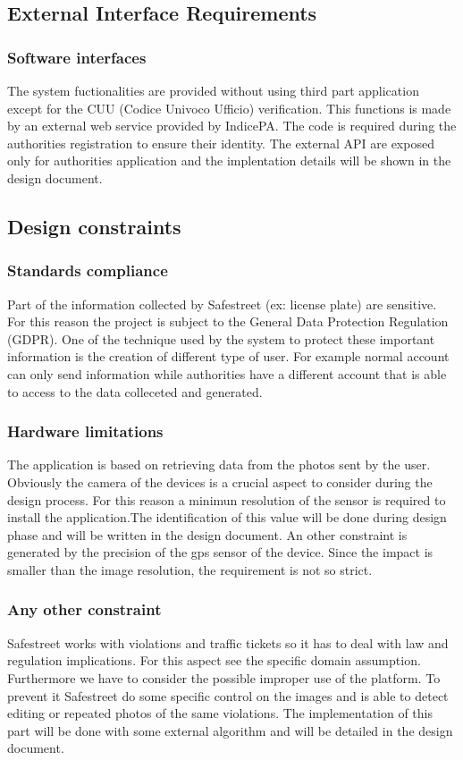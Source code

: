 
\subsection{External Interface Requirements}
\subsubsection{Software interfaces}
The system fuctionalities are provided without using third part application except for the CUU (Codice Univoco Ufficio) verification. This functions is made by an external web service provided by IndicePA. The code is required during the authorities registration to ensure their identity.
The external API are exposed only for authorities application and the implentation details will be shown in the design document.

\subsection{Design constraints}
\subsubsection{Standards compliance}
Part of the information collected by Safestreet (ex: license plate) are sensitive. For this reason the project is subject to the General Data Protection Regulation (GDPR). One of the technique used by the system to protect these important information is the creation of different type of user. For example normal account can only send information while authorities have a different account that is able to access to the data colleceted and generated.

\subsubsection{Hardware limitations}
The application is based on retrieving data from the photos sent by the user. Obviously the camera of the devices is a crucial aspect to consider during the design process. For this reason a minimun resolution of the sensor is required to install the application.The identification of this value will be done during design phase and will be written in the design document.
An other constraint is generated by the precision of the gps sensor of the device. Since the impact is smaller than the image resolution, the requirement is not so strict. 

\subsubsection{Any other constraint}
Safestreet works with violations and traffic tickets so it has to deal with law and regulation implications.
For this aspect see the specific domain assumption. 
Furthermore we have to consider the possible improper use of the platform. To prevent it Safestreet do some specific control on the images and is able to detect editing or repeated photos of the same violations. The implementation of this part will be done with some external algorithm and will be detailed in the design document.

